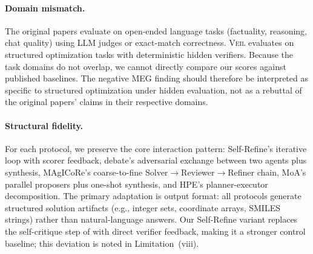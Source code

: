 \documentclass{article}
\begin{document}
\paragraph{Domain mismatch.}
The original papers evaluate on open-ended language tasks (factuality, reasoning, chat quality) using LLM judges or exact-match correctness. \textsc{Veil} evaluates on structured optimization tasks with deterministic hidden verifiers. Because the task domains do not overlap, we cannot directly compare our scores against published baselines. The negative MEG finding should therefore be interpreted as specific to structured optimization under hidden evaluation, not as a rebuttal of the original papers' claims in their respective domains.

\paragraph{Structural fidelity.}
For each protocol, we preserve the core interaction pattern: Self-Refine's iterative loop with scorer feedback, debate's adversarial exchange between two agents plus synthesis, MAgICoRe's coarse-to-fine Solver$\to$Reviewer$\to$Refiner chain, MoA's parallel proposers plus one-shot synthesis, and HPE's planner-executor decomposition. The primary adaptation is output format: all protocols generate structured solution artifacts (e.g., integer sets, coordinate arrays, SMILES strings) rather than natural-language answers. Our Self-Refine variant replaces the self-critique step of \citet{madaan2023selfrefine} with direct verifier feedback, making it a stronger control baseline; this deviation is noted in Limitation~(viii).
\end{document}
